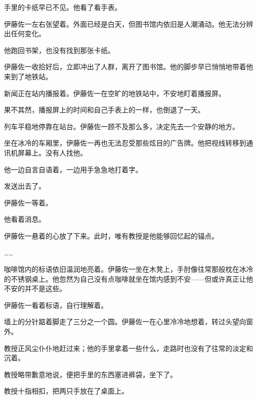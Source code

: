 手里的卡纸早已不见。他看了看手表。



伊藤佐一左右张望着。外面已经是白天，但图书馆内依旧是人潮涌动。他无法分辨出任何变化。

他跑回书架，也没有找到那张卡纸。

伊藤佐一收拾好后，立即冲出了人群，离开了图书馆。他的脚步早已悄悄地带着他来到了地铁站。

新闻正在站内播报着。伊藤佐一在空旷的地铁站中，不安地盯着播报屏。

果不其然，播报屏上的时间和自己手表上的一样，也倒退了一天。

列车平稳地停靠在站台。伊藤佐一顾不及那么多，决定先去一个安静的地方。

坐在冰冷的车厢里，伊藤佐一再也无法忍受那些炫目的广告牌。他把视线转移到通讯机屏幕上。没有人找他。


他一边自言自语着，一边用手急急地打着字。

发送出去了。

伊藤佐一等着。


他看着消息。


伊藤佐一悬着的心放了下来。此时，唯有教授是他能够回忆起的锚点。

……

咖啡馆内的标语依旧温润地亮着。伊藤佐一坐在木凳上，手肘像往常那般枕在冰冷的不锈钢桌上。他忽然为自己没有点咖啡就坐在馆内感到不安——但或许真正让他不安的并不是这些。


伊藤佐一看着标语，自行理解着。

墙上的分针踮着脚走了三分之一个圆。伊藤佐一在心里冷冷地想着，转过头望向窗外。

教授正风尘仆仆地赶过来；他的手里拿着一些什么，走路时也没有了往常的淡定和沉着。

教授略带歉意地说，便把手里的东西塞进裤袋，坐下了。

教授十指相扣，把两只手放在了桌面上。

